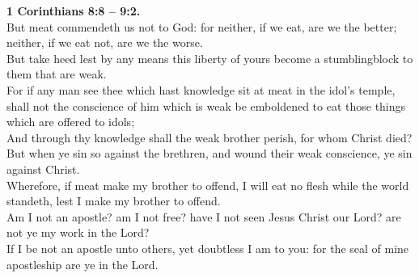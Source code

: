 \documentclass[10pt]{article} %
\begin{document}
{\begin{minipage}[t]{0.45\textwidth}
\textbf{1 Corinthians 8:8 -- 9:2.}\\
But meat commendeth us not to God: for neither, if we eat, are we the better; neither, if we eat not, are we the worse.\\
But take heed lest by any means this liberty of yours become a stumblingblock to them that are weak.\\
For if any man see thee which hast knowledge sit at meat in the idol's temple, shall not the conscience of him which is weak be emboldened to eat those things which are offered to idols;\\
And through thy knowledge shall the weak brother perish, for whom Christ died?\\
But when ye sin so against the brethren, and wound their weak conscience, ye sin against Christ.\\
Wherefore, if meat make my brother to offend, I will eat no flesh while the world standeth, lest I make my brother to offend.\\
Am I not an apostle? am I not free? have I not seen Jesus Christ our Lord? are not ye my work in the Lord?\\
If I be not an apostle unto others, yet doubtless I am to you: for the seal of mine apostleship are ye in the Lord.\\

\end{minipage}}
\vspace*{\fill}
\newpage
\Huge%
\vspace*{\fill}
\begin{spacing}{1.0}%
\end{spacing}
\vspace*{\fill}
\end{document}
